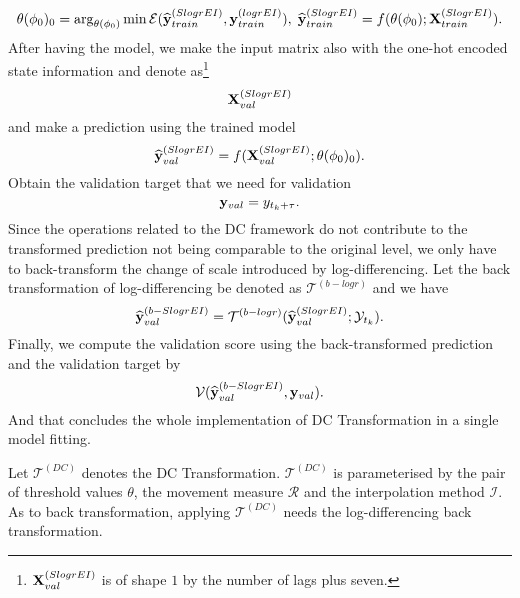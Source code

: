 \begin{equation*}
    \theta(\phi_0)_0 = \arg_{\theta(\phi_0)} \min \mathcal{E}(\widehat{\mathbf{y}}^{(SlogrEI)}_{train}, \mathbf{y}^{(logrEI)}_{train}), \; \widehat{\mathbf{y}}^{(SlogrEI)}_{train} = f(\theta(\phi_0); \mathbf{X}^{(SlogrEI)}_{train}).
\end{equation*}
After having the model, we make the input matrix also with the one-hot encoded state information and denote as\footnote{$\mathbf{X}^{(SlogrEI)}_{val}$ is of shape $1$ by the number of lags plus seven.}
\begin{equation*}
    \mathbf{X}^{(SlogrEI)}_{val}
\end{equation*}
and make a prediction using the trained model
\begin{equation*}
    \widehat{\mathbf{y}}^{(SlogrEI)}_{val} = f(\mathbf{X}^{(SlogrEI)}_{val} ; \theta(\phi_0)_0).
\end{equation*}
Obtain the validation target that we need for validation
\begin{equation*}
    \mathbf{y}_{val} = y_{t_k + \tau}.
\end{equation*}
Since the operations related to the DC framework do not contribute to the transformed prediction not being comparable to the original level, we only have to back-transform the change of scale introduced by log-differencing. Let the back transformation of log-differencing be denoted as $\mathcal{T}^{(b-logr)}$ and we have
\begin{equation*}
    \widehat{\mathbf{y}}^{(b-SlogrEI)}_{val} = \mathcal{T}^{(b-logr)} (\widehat{\mathbf{y}}^{(SlogrEI)}_{val} ; \mathcal{Y}_{t_k}).
\end{equation*}
Finally, we compute the validation score using the back-transformed prediction and the validation target by
\begin{equation*}
    \mathcal{V} (\widehat{\mathbf{y}}^{(b-SlogrEI)}_{val}, \mathbf{y}_{val}).
\end{equation*}
And that concludes the whole implementation of DC Transformation in a single model fitting.

Let $\mathcal{T}^{(DC)}$ denotes the DC Transformation. $\mathcal{T}^{(DC)}$ is parameterised by the pair of threshold values $\theta$, the movement measure $\mathcal{R}$ and the interpolation method $\mathcal{I}$. As to back transformation, applying $\mathcal{T}^{(DC)}$ needs the log-differencing back transformation.

